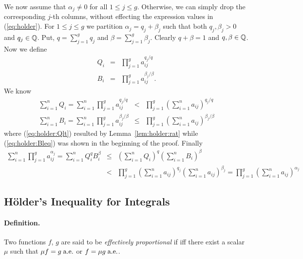 \begin{thmproof}
We now assume that  \(\alpha_j \neq 0\)
for all \(1\leq j \leq g\). Otherwise,
we can simply drop the corresponding $j$-th columns,
without effecting the expression values in (\ref{eq:holder}).
For \(1\leq j \leq g\) we
partition \(\alpha_j = q_j + \beta_j\)
such that both \(q_j, \beta_j > 0\) and \(q_j \in \mathbb{Q}\).
Put,
\(q = \sum_{j=1}^g q_j\) and \(\beta = \sum_{j=1}^g \beta_j\).
Clearly \(q+\beta=1\) and \(q,\beta \in \mathbb{Q}\).
Now we define
\begin{eqnarray*}
Q_i &=& \prod_{j=1}^g a_{ij}^{q_j/q} \\
B_i &=& \prod_{j=1}^g a_{ij}^{\beta_j/\beta}.
\end{eqnarray*}
We know
\begin{eqnarray}
\sum_{i=1}^n Q_i = \sum_{i=1}^n \prod_{j=1}^g a_{ij}^{q_j/q}
  &<& \label{eq:holder:Qlt}
      \prod_{j=1}^g \left(\sum_{i=1}^n  a_{ij}\right)^{q_j/q} \\
\sum_{i=1}^n B_i = \sum_{i=1}^n \prod_{j=1}^g a_{ij}^{\beta_j/\beta}
  &\leq& \label{eq:holder:Bleq}
      \prod_{j=1}^g \left(\sum_{i=1}^n  a_{ij}\right)^{\beta_j/\beta}
\end{eqnarray}
where (\ref{eq:holder:Qlt}) resulted by Lemma~\ref{lem:holder:rat}
while (\ref{eq:holder:Bleq}) was shown in the beginning of the proof.
Finally
\begin{eqnarray*}
 \sum_{i=1}^n \prod_{j=1}^g a_{ij}^{\alpha_j}
 =    \sum_{i=1}^n Q_i^q B_i^\beta
 &\leq& \left(\sum_{i=1}^n Q_i\right)^q \left(\sum_{i=1}^n  B_i\right)^\beta \\
 &<&
    \prod_{j=1}^g
          \left(\sum_{i=1}^n  a_{ij}\right)^{q_j}
          \left(\sum_{i=1}^n  a_{ij}\right)^{\beta_j}
 =   \prod_{j=1}^g
          \left(\sum_{i=1}^n  a_{ij}\right)^{\alpha_j}
\end{eqnarray*}
\end{thmproof}


\subsection{H\"older's Inequality for Integrals}

\paragraph{Definition.} Two functions $f$, $g$
are said to be \emph{effectively proportional} if
iff there exist a scalar \(\mu\) such that
\(\mu f = g \;\textrm{a.e.}\)  or \(f = \mu g\;\textrm{a.e.}\).


